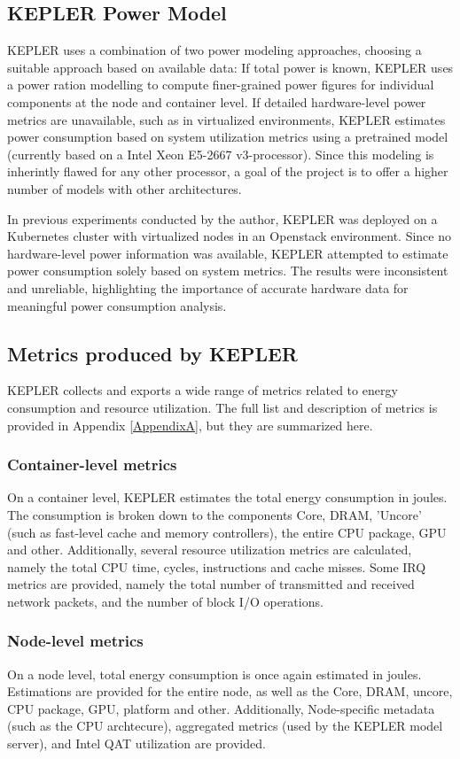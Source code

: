 \subsection{KEPLER Power Model}

KEPLER uses a combination of two power modeling approaches, choosing a suitable approach based on available data: If total power is known, KEPLER uses a power ration modelling to compute finer-grained power figures for individual components at the node and container level. If detailed hardware-level power metrics are unavailable, such as in virtualized environments, KEPLER estimates power consumption based on system utilization metrics using a pretrained model (currently based on a Intel Xeon E5-2667 v3-processor). Since this modeling is inherintly flawed for any other processor, a goal of the project is to offer a higher number of models with other architectures.

In previous experiments conducted by the author, KEPLER was deployed on a Kubernetes cluster with virtualized nodes in an Openstack environment. Since no hardware-level power information was available, KEPLER attempted to estimate power consumption solely based on system metrics. The results were inconsistent and unreliable, highlighting the importance of accurate hardware data for meaningful power consumption analysis.

\subsection{Metrics produced by KEPLER}

KEPLER collects and exports a wide range of metrics related to energy consumption and resource utilization. The full list and description of metrics is provided in Appendix \ref{AppendixA}, but they are summarized here.

\subsubsection{Container-level metrics}

On a container level, KEPLER estimates the total energy consumption in joules. The consumption is broken down to the components Core, DRAM, 'Uncore' (such as fast-level cache and memory controllers), the entire CPU package, GPU and other. Additionally, several resource utilization metrics are calculated, namely the total CPU time, cycles, instructions and cache misses. Some IRQ metrics are provided, namely the total number of transmitted and received network packets, and the number of block I/O operations.  

\subsubsection{Node-level metrics}

On a node level, total energy consumption is once again estimated in joules. Estimations are provided for the entire node, as well as the Core, DRAM, uncore, CPU package, GPU, platform and other. Additionally, Node-specific metadata (such as the CPU archtecure), aggregated metrics (used by the KEPLER model server), and Intel QAT utilization are provided.